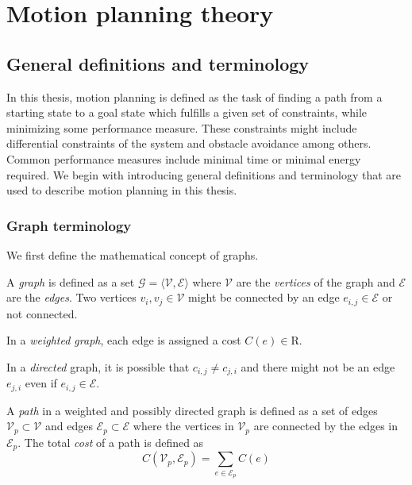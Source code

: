 \chapter{Motion planning theory}\label{cha:motion_planning}
\section{General definitions and terminology}
In this thesis, motion planning is defined as the task of finding a
path from a starting state to a goal state which fulfills a given set of constraints, while minimizing some 
performance measure.
These constraints might include differential constraints of the system and obstacle avoidance among others.
Common performance measures include minimal time or minimal energy required.
We begin with introducing general definitions and terminology that are used to
describe motion planning in this thesis.
\subsection{Graph terminology}
We first define the mathematical concept of graphs.

\begin{definition}[Graph]
    A \textit{graph} is defined as a set $\mathcal{G}=\langle\mathcal{V},\mathcal{E}\rangle$ 
    where $\mathcal{V}$ are the \textit{vertices} of the graph and $\mathcal{E}$ are the \textit{edges}.
    Two vertices $v_i,v_j\in\mathcal{V}$ might be connected by an edge $e_{i,j}\in\mathcal{E}$ or not connected.
\end{definition}
    
\begin{definition}
    In a \textit{weighted graph}, each edge is assigned a cost $C(e)\in\mathrm{R}$. 
\end{definition}


\begin{definition}
    In a \textit{directed} graph, it is possible that $c_{i,j}\neq c_{j,i}$ and
    there might not be an edge $e_{j,i}$ even if $e_{i,j}\in\mathcal{E}$.
\end{definition}

\begin{definition}[Path]
    A \textit{path} in a weighted and possibly directed graph is defined as a set of edges
    $\mathcal{V}_p\subset\mathcal{V}$ and edges $\mathcal{E}_p\subset\mathcal{E}$ where the vertices in 
    $\mathcal{V}_p$ are connected by the edges in $\mathcal{E}_p$.
    The total \textit{cost} of a path is defined as
    \begin{equation}
        C(\mathcal{V}_p, \mathcal{E}_p)=\sum_{e\in\mathcal{E}_p}C(e)
    \end{equation}
\end{definition}

